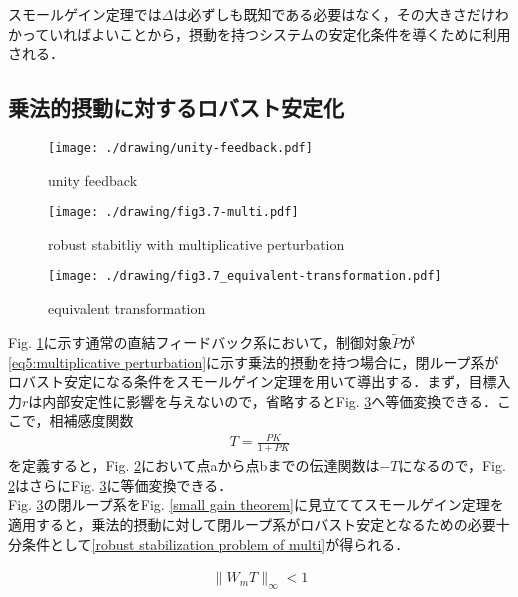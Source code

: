 \documentclass[a4paper,11pt,uplatex]{jsarticle} %
\theoremstyle{definition}	%
\newcommand{\figref}[1]{Fig. \ref{#1}}
\begin{document}
{スモールゲイン定理では$ \Delta $は必ずしも既知である必要はなく，その大きさだけわかっていればよいことから，摂動を持つシステムの安定化条件を導くために利用される．

\subsection{乗法的摂動に対するロバスト安定化}
\begin{figure}[t]
\centering
\texttt{[image: ./drawing/unity-feedback.pdf]}
\caption{unity feedback}
\label{unity feedback}
\end{figure}

\begin{figure}[t]
\centering
\texttt{[image: ./drawing/fig3.7-multi.pdf]}
\caption{robust stabitliy with multiplicative perturbation}
\label{robust stabitliy with multiplicative perturbation}
\end{figure}

\begin{figure}[t]
\centering
\texttt{[image: ./drawing/fig3.7\_equivalent-transformation.pdf]}
\caption{equivalent transformation}
\label{equivalent transformation}
\end{figure}
\figref{unity feedback}に示す通常の直結フィードバック系において，制御対象$ \tilde{P} $が\eqref{eq5:multiplicative perturbation}に示す乗法的摂動を持つ場合に，閉ループ系がロバスト安定になる条件をスモールゲイン定理を用いて導出する．まず，目標入力$r$は内部安定性に影響を与えないので，省略すると\figref{equivalent transformation}へ等価変換できる．ここで，相補感度関数
\begin{align*}
 T = \frac{PK}{1 + PK}
\end{align*}
を定義すると，\figref{robust stabitliy with multiplicative perturbation}において点aから点bまでの伝達関数は$-T$になるので，\figref{robust stabitliy with multiplicative perturbation}はさらに\figref{equivalent transformation}に等価変換できる．\\
\figref{equivalent transformation}の閉ループ系を\figref{small gain theorem}に見立ててスモールゲイン定理を適用すると，乗法的摂動に対して閉ループ系がロバスト安定となるための必要十分条件として\eqref{robust stabilization problem of multi}が得られる．

\begin{align}
\label{robust stabilization problem of multi}
 \| W_m T \|_\infty < 1
\end{align}

}
\end{document}
